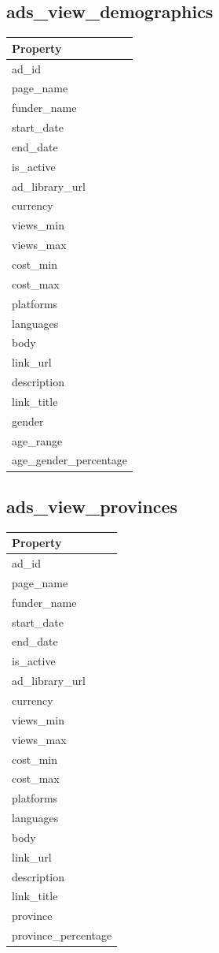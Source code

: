 \documentclass[
  letterpaper,
  DIV=11,
  numbers=noendperiod]{scrreprt}
\begin{document}
\subsection{ads\_view\_demographics}

\begin{longtable}[]{@{}l@{}}
\toprule\noalign{}
Property \\
\midrule\noalign{}
\endhead
\bottomrule\noalign{}
\endlastfoot
ad\_id \\
page\_name \\
funder\_name \\
start\_date \\
end\_date \\
is\_active \\
ad\_library\_url \\
currency \\
views\_min \\
views\_max \\
cost\_min \\
cost\_max \\
platforms \\
languages \\
body \\
link\_url \\
description \\
link\_title \\
gender \\
age\_range \\
age\_gender\_percentage \\
\end{longtable}

\subsection{ads\_view\_provinces}

\begin{longtable}[]{@{}l@{}}
\toprule\noalign{}
Property \\
\midrule\noalign{}
\endhead
\bottomrule\noalign{}
\endlastfoot
ad\_id \\
page\_name \\
funder\_name \\
start\_date \\
end\_date \\
is\_active \\
ad\_library\_url \\
currency \\
views\_min \\
views\_max \\
cost\_min \\
cost\_max \\
platforms \\
languages \\
body \\
link\_url \\
description \\
link\_title \\
province \\
province\_percentage \\
\end{longtable}
\end{document}
